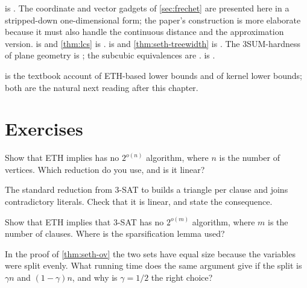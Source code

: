  is \citet{Bringmann2014}. The coordinate and vector gadgets
of \cref{sec:frechet} are presented here in a stripped-down one-dimensional
form; the paper's construction is more elaborate because it must also handle
the continuous distance and the approximation version.
 is \citet{BackursIndyk2018} and \cref{thm:lcs} is
\citet{AbboudBackursVassilevskaWilliams2015}.
 is \citet{ChenHuangKanjXia2006} and
\cref{thm:seth-treewidth} is \citet{LokshtanovMarxSaurabh2018}. The
3SUM-hardness of plane geometry is \citet{GajentaanOvermars1995}; the subcubic
equivalences are \citet{VassilevskaWilliamsWilliams2018}.
 is \citet{BodlaenderDowneyFellowsHermelin2009}.

\citet[Chapter~14]{CyganEtAl2015} is the textbook account of ETH-based lower
bounds and \citet[Chapter~15]{CyganEtAl2015} of kernel lower bounds; both are
the natural next reading after this chapter.

\section{Exercises}
\label{sec:ex-lower-bounds}

\begin{exercise}\label{ex:eth-vc}
Show that ETH implies  has no $2^{o(n)}$ algorithm, where
$n$ is the number of vertices. Which reduction do you use, and is it linear?
\end{exercise}

\begin{exercise}\label{ex:eth-is}
The standard reduction from $3$-SAT to  builds a triangle
per clause and joins contradictory literals. Check that it is linear, and state
the consequence.
\end{exercise}

\begin{exercise}
Show that ETH implies that $3$-SAT has no $2^{o(m)}$ algorithm, where $m$ is
the number of clauses. Where is the sparsification lemma used?
\end{exercise}

\begin{exercise}
In the proof of \cref{thm:seth-ov} the two sets have equal size because the
variables were split evenly. What running time does the same argument give if
the split is $\gamma n$ and $(1-\gamma)n$, and why is $\gamma = 1/2$ the right
choice?
\end{exercise}


